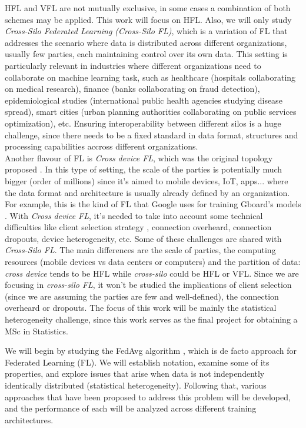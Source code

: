 HFL and VFL are not mutually exclusive, in some cases a combination of both schemes may be applied. This work will focus on HFL. Also, we will only study \textit{Cross-Silo Federated Learning (Cross-Silo FL)},
which is a variation of FL that addresses the scenario where data is distributed across different organizations, usually few parties, each maintaining control over its own data.
This setting is particularly relevant in industries where different organizations need to collaborate on machine learning task, such as healthcare (hospitals collaborating on medical research), finance (banks collaborating on fraud detection), epidemiological studies (international public health agencies studying disease spread),
smart cities (urban planning authorities collaborating on public services optimization), etc. Ensuring interoperability between different silos is a huge challenge, since there needs to be a fixed standard in data format, structures and processing capabilities accross different organizations.\\
Another flavour of FL is \textit{Cross device FL}, which was the original topology proposed \cite*{mcmahan2023a}. In this type of setting, the scale of the parties is potentially much bigger (order of millions) since it's aimed to mobile devices, IoT, apps... where the data format and architecture is usually already defined by an organization. For example, this is the kind of FL that Google uses for training Gboard's models \cite*{zhang2023}. With \textit{Cross device FL}, it's needed to take into account some technical difficulties like client selection strategy \cite*{smestad2023}, connection overheard, connection dropouts, device heterogeneity, etc.
Some of these challenges are shared with \textit{Cross-Silo FL}. The main differences are the scale of parties, the computing resources (mobile devices vs data centers or computers) and the partition of data: \textit{cross device} tends to be HFL while \textit{cross-silo} could be HFL or VFL. Since we are focusing in \textit{cross-silo FL}, it won't be studied the implications of client selection (since we are assuming the parties are few and well-defined), the connection overheard or dropouts. The focus of this work will be mainly the statistical heterogeneity challenge, since this work serves as the final project for obtaining a MSc in Statistics.

We will begin by studying the FedAvg algorithm \cite{mcmahan2023a}, which is de facto approach for Federated Learning (FL). We will establish notation, examine some of its properties, and explore issues that arise when data is not independently identically distributed (statistical heterogeneity). Following that, various approaches that have been proposed to address this problem will be developed, and the performance of each will be analyzed across different training architectures.

